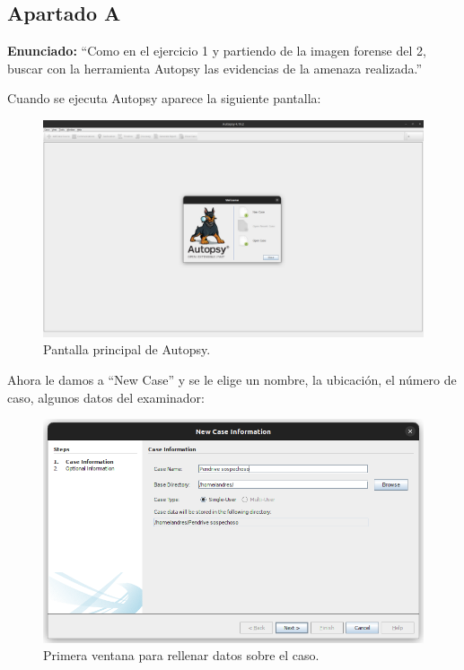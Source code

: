 \documentclass{article}
\begin{document}
\subsection{Apartado A}

\textbf{Enunciado: } ``Como en el ejercicio 1 y partiendo de la imagen forense del 2, buscar con la herramienta Autopsy las evidencias de la amenaza realizada.''

\bigskip

Cuando se ejecuta Autopsy aparece la siguiente pantalla:

\begin{figure}[H]
    \centering
    \includegraphics[width=\textwidth]{imagenes/Captura desde 2022-12-03 21-22-16.png}
    \caption{Pantalla principal de Autopsy.}
\end{figure}

\newpage

Ahora le damos a ``New Case'' y se le elige un nombre, la ubicación, el número de caso, algunos datos del examinador:

\begin{figure}[H]
    \centering
    \includegraphics[width=\textwidth]{imagenes/Captura desde 2022-12-03 21-42-29.png}
    \caption{Primera ventana para rellenar datos sobre el caso.}
\end{figure}
\end{document}
